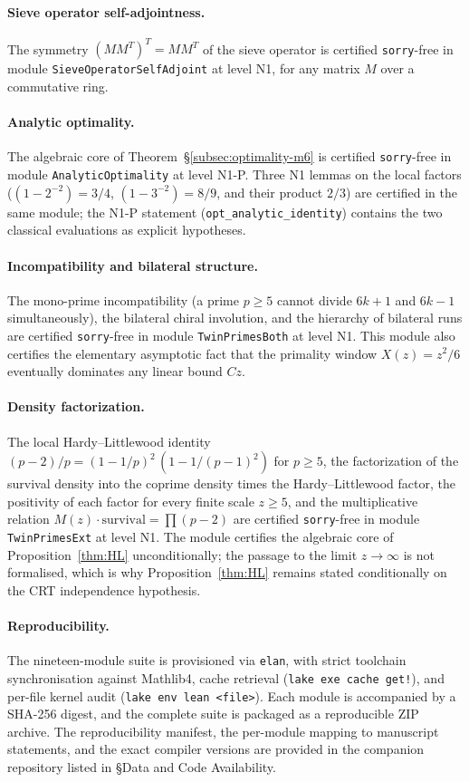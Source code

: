 \documentclass[11pt]{amsart}
\numberwithin{equation}{section}
\theoremstyle{plain}
\theoremstyle{definition}
\begin{document}
\paragraph{Sieve operator self-adjointness.}
The symmetry $(MM^T)^T=MM^T$ of the sieve operator is certified
\texttt{sorry}-free in module \texttt{SieveOperatorSelfAdjoint} at
level N1, for any matrix $M$ over a commutative ring.

\paragraph{Analytic optimality.}
The algebraic core of Theorem~\S\ref{subsec:optimality-m6} is certified
\texttt{sorry}-free in module \texttt{AnalyticOptimality} at level
N1-P. Three N1 lemmas on the local factors
($(1-2^{-2})=3/4$, $(1-3^{-2})=8/9$, and their product $2/3$) are
certified in the same module; the N1-P statement
(\texttt{opt\_analytic\_identity}) contains the two classical
evaluations as explicit hypotheses.

\paragraph{Incompatibility and bilateral structure.}
The mono-prime incompatibility (a prime $p\ge 5$ cannot divide $6k+1$
and $6k-1$ simultaneously), the bilateral chiral involution, and the
hierarchy of bilateral runs are certified \texttt{sorry}-free in
module \texttt{TwinPrimesBoth} at level N1. This module also
certifies the elementary asymptotic fact that the primality window
$X(z)=z^2/6$ eventually dominates any linear bound $Cz$.

\paragraph{Density factorization.}
The local Hardy--Littlewood identity
$(p-2)/p=(1-1/p)^2\,(1-1/(p-1)^2)$ for $p\ge 5$, the factorization
of the survival density into the coprime density times the
Hardy--Littlewood factor, the positivity of each factor for every
finite scale $z\ge 5$, and the multiplicative relation
$M(z)\cdot\text{survival}=\prod(p-2)$ are certified \texttt{sorry}-free
in module \texttt{TwinPrimesExt} at level N1. The module certifies
the algebraic core of Proposition~\ref{thm:HL} unconditionally; the
passage to the limit $z\to\infty$ is not formalised, which is why
Proposition~\ref{thm:HL} remains stated conditionally on the CRT
independence hypothesis.

\paragraph{Reproducibility.}
The nineteen-module suite is provisioned via \texttt{elan}, with
strict toolchain synchronisation against Mathlib4, cache retrieval
(\texttt{lake exe cache get!}), and per-file kernel audit
(\texttt{lake env lean <file>}). Each module is accompanied by a
SHA-256 digest, and the complete suite is packaged as a reproducible
ZIP archive. The reproducibility manifest, the per-module mapping to
manuscript statements, and the exact compiler versions are provided
in the companion repository listed in §Data and Code Availability.
\end{document}
